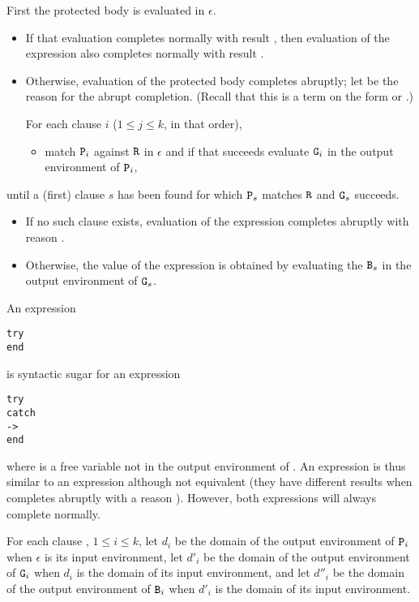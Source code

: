 First the protected body  is evaluated in $\epsilon$.
\begin{itemize}
\item If that
evaluation completes normally with result , then evaluation of the
 expression also completes normally with result .
\item Otherwise, evaluation of the protected body completes abruptly;
let  be the reason for the abrupt completion.
(Recall that this is a term on the form 
or .)

For each clause $i$ ($1\leq j\leq k$, in that order),
\begin{itemize}
\item match ${\tt{\sl P}}_i$ against ${\tt{\sl R}}$ in $\epsilon$ and if that
succeeds evaluate ${\tt{\sl G}}_i$ in the output environment of ${\tt{\sl P}}_i$,
\end{itemize}
\end{itemize}
until a (first) clause $s$ has been found for which
${\tt{\sl P}}_s$ matches ${\tt{\sl R}}$ and ${\tt{\sl G}}_s$ succeeds.
\begin{itemize}
\item If no such clause exists, evaluation of the
 expression completes abruptly with reason .
\item Otherwise, the value of the  expression
is obtained by evaluating the ${\tt{\sl B}}_s$ in the output
environment of ${\tt{\sl G}}_s$.
\end{itemize}

An expression
\begin{alltt}
try
end
\end{alltt}
is syntactic sugar for an expression
\begin{alltt}
try
catch
     -> 
end
\end{alltt}
where  is a free variable not in the output environment of .
An expression  is thus similar to an
expression  although not equivalent (they have different
results when  completes abruptly with a reason ).
However, both expressions will always complete normally.

\ENVIRONMENTS

For each clause , $1\leq
i\leq k$, let $d_i$ be the domain of the output environment of
${\tt{\sl P}}_i$ when $\epsilon$ is its input environment, let $d'_i$ be
the domain of the output environment of ${\tt{\sl G}}_i$ when $d_i$ is the
domain of its input environment, and let $d''_i$ be the domain of the
output environment of ${\tt{\sl B}}_i$ when $d'_i$ is the domain of its
input environment.

